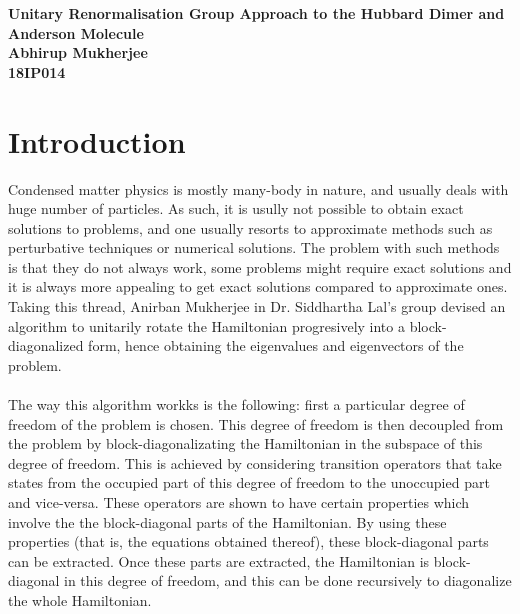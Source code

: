 \documentclass[12pt]{article}
\begin{document}
\begin{titlepage}
\begin{center}
	\vspace{10pt}
\bf{\Large{Unitary Renormalisation Group Approach to the Hubbard Dimer and Anderson Molecule}}\\
	\vspace{10pt}
	\vspace{30pt}
	\bf{\Large{Abhirup Mukherjee}}\\
	\vspace{30pt}
	\bf{\Large{{18IP014}}}
\end{center}

\end{titlepage}

\tableofcontents
\newpage
\section{Introduction}
Condensed matter physics is mostly many-body in nature, and usually deals with huge number of particles. As such, it is usully not possible to obtain exact solutions to problems, and one usually resorts to approximate methods such as perturbative techniques or numerical solutions. The problem with such methods is that they do not always work, some problems might require exact solutions and it is always more appealing to get exact solutions compared to approximate ones. Taking this thread, Anirban Mukherjee in Dr. Siddhartha Lal's group devised an algorithm to unitarily rotate the Hamiltonian progresively into a block-diagonalized form, hence obtaining the eigenvalues and eigenvectors of the problem.
\paragraph{}
The way this algorithm workks is the following: first a particular degree of freedom of the problem is chosen. This degree of freedom is then decoupled from the problem by block-diagonalizating the Hamiltonian in the subspace of this degree of freedom. This is achieved by considering transition operators that take states from the occupied part of this degree of freedom to the unoccupied part and vice-versa. These operators are shown to have certain properties which involve the the block-diagonal parts of the Hamiltonian. By using these properties (that is, the equations obtained thereof), these block-diagonal parts can be extracted. Once these parts are extracted, the Hamiltonian is block-diagonal in this degree of freedom, and this can be done recursively to diagonalize the whole Hamiltonian.
\end{document}
